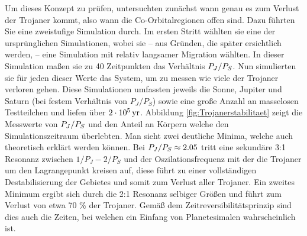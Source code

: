 \documentclass[12pt,a4paper,twoside]{article}
\renewcommand{\cite}{\citep}
\begin{document}
Um dieses Konzept zu prüfen, untersuchten \cite{Morbidelli2005} zunächst wann genau es zum Verlust der Trojaner kommt, also wann die Co-Orbitalregionen offen sind.
Dazu führten Sie eine zweistufige Simulation durch. Im ersten Stritt wählten sie eine der ursprünglichen Simulationen, wobei sie – aus Gründen, die später ersichtlich werden, – eine Simulation mit relativ langsamer Migration wählten. %
In dieser Simulation maßen sie zu 40 Zeitpunkten das Verhältnis $P_J/P_S$.
Nun simulierten sie für jeden dieser Werte das System, um zu messen wie viele der Trojaner verloren gehen. Diese Simulationen umfassten jeweils die Sonne, Jupiter und Saturn (bei festem Verhältnis von $P_J/P_S$) sowie eine große Anzahl an masselosen Testteilchen und liefen über $\unit[2\cdot10^5]{yr}$.
Abbildung \ref{fig:Trojanerstabilitaet} zeigt die Messwerte von $P_J/P_S$ und den Anteil an Körpern welche den Simulationszeitraum überlebten. Man sieht zwei deutliche Minima, welche auch theoretisch erklärt werden können.
Bei $P_J/P_S \approx 2.05$ tritt eine sekundäre 3:1 Resonanz zwischen $1/P_J-2/P_S$ und der Oszilationsfrequenz mit der die Trojaner um den Lagrangepunkt kreisen auf, diese führt zu einer vollständigen Destabilisierung der Gebietes und somit zum Verlust aller Trojaner.
Ein zweites Minimum ergibt sich durch die 2:1 Resonanz selbiger Größen und führt zum Verlust von etwa 70 \% der Trojaner.
Gemäß dem Zeitreversibilitätsprinzip sind dies auch die Zeiten, bei welchen ein Einfang von Planetesimalen wahrscheinlich ist.
\end{document}
